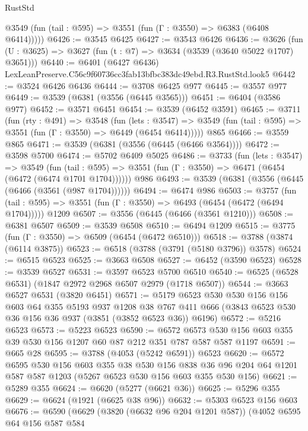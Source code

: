 \begin{lexlean}{RustStd}
\begin{coremodule}
      @3549 (fun (tail : @595) => @3551 (fun (Γ : @3550) => @6383 (@6408 @6414)))))
@6426 := @3545 @6425
@6427 := @3543 @6426
@6436 := @3626 (fun (U : @3625) => @3627 (fun (t : @7) => @3634 (@3539 (@3640 @5022 @1707) @3651)))
@6440 := @6401 (@6427 @6436) LexLeanPreserve.C56c9f60736cc3fab13bfbc383dc49ebd.R3.RustStd.look5
@6442 := @3524 @6426 @6436
@6444 := @3708 @6425 @977
@6445 := @3557 @977
@6449 := @3539 (@6381 (@3556 (@6445 @3565)))
@6451 := @6404 (@3586 @977)
@6452 := @3571 @6451
@6454 := @3539 (@6452 @3591)
@6465 := @3711
    (fun (rty : @491) =>
    @3548
      (fun (lets : @3547) =>
      @3549 (fun (tail : @595) => @3551 (fun (Γ : @3550) => @6449 (@6454 @6414)))))
    @865
@6466 := @3559 @865
@6471 := @3539 (@6381 (@3556 (@6445 (@6466 @3564))))
@6472 := @3598 @5700
@6474 := @5702 @6409 @5025
@6486 := @3733
    (fun (lets : @3547) =>
    @3549
      (fun (tail : @595) => @3551 (fun (Γ : @3550) => @6471 (@6454 (@6472 (@6474 @1701 @1704))))))
    @986
@6493 := @3539 (@6381 (@3556 (@6445 (@6466 (@3561 (@987 @1704))))))
@6494 := @6474 @986
@6503 := @3757
    (fun (tail : @595) => @3551 (fun (Γ : @3550) => @6493 (@6454 (@6472 (@6494 @1704)))))
    @1209
@6507 := @3556 (@6445 (@6466 (@3561 @1210)))
@6508 := @6381 @6507
@6509 := @3539 @6508
@6510 := @6494 @1209
@6515 := @3775 (fun (Γ : @3550) => @6509 (@6454 (@6472 @6510)))
@6518 := @3788 (@3874 (@6114 @3875))
@6523 := @6518 (@3788 (@3791 (@5180 @3796)) @3578)
@6524 := @6515 @6523
@6525 := @3663 @6508
@6527 := @6452 (@3590 @6523)
@6528 := @3539 @6527
@6531 := @3597 @6523 @5700 @6510
@6540 := @6525 (@6528 @6531) (@1847 @2972 @2968 @6507 @2979 (@1718 @6507))
@6544 := @3663 @6527 @6531 (@3820 @6451)
@6571 := @5179
    @6523
    @530
    @530
    @156
    @156
    @603
    @64
    @355
    @5193
    @937
    @1208
    @38
    @767
    @411
    @666
    (@3843 @6523 @530 @36 @156 @36 @937 (@3851 (@3852 @6523 @36)) @6196)
@6572 := @5216 @6523
@6573 := @5223 @6523
@6590 := @6572 @6573 @530 @156 @603 @355 @39 @530 @156 @1207 @60 @87 @212 @351 @787 @587 @587 @1197
@6591 := @665 @28
@6595 := @3788 (@4053 (@5242 @6591)) @6523
@6620 := @6572
    @6595
    @530
    @156
    @603
    @355
    @38
    @530
    @156
    @838
    @36
    @96
    @204
    @64
    @1201
    @587
    @587
    @1203
    (@5267 @6523 @530 @156 @603 @355 @530 @156)
@6621 := @5289 @355
@6624 := @6620 (@5277 (@6621 @36))
@6625 := @5296 @355
@6629 := @6624 (@1921 (@6625 @38 @96))
@6632 := @5303 @6523 @156 @603
@6676 := @6590
    (@6629
      (@3820 (@6632 @96 @204 @1201 @587))
      (@4052
        @6595
        @64
        @156
        @587
        @584

\end{coremodule}
\end{lexlean}
